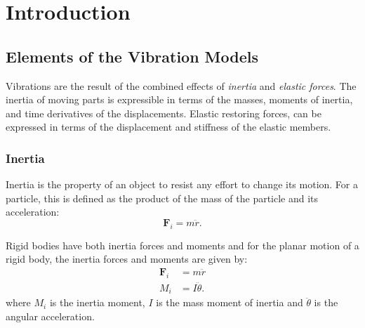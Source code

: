 
\section{Introduction}

\subsection{Elements of the Vibration Models}
Vibrations are the result of the combined effects of \textit{inertia} and \textit{elastic forces}. The inertia of moving parts is expressible in terms of the masses, moments of inertia, and time derivatives of the displacements. Elastic restoring forces, can be expressed in terms of the displacement and stiffness of the elastic members.

\subsubsection{Inertia}
Inertia is the property of an object to resist any effort to change its motion. For a particle, this is defined as the product of the mass of the particle and its acceleration:
\[ 
  \textbf{F}_i = m \ddot{r}
.\]

Rigid bodies have both inertia forces and moments and for the planar motion of a rigid body, the inertia forces and moments are given by:
\begin{align*}
  \textbf{F}_i &= m \ddot{r} \\
  M_i &= I \ddot{\theta}
.\end{align*}
where $M_i$ is the inertia moment, $I$ is the mass moment of inertia and $\ddot{\theta}$ is the angular acceleration. 

